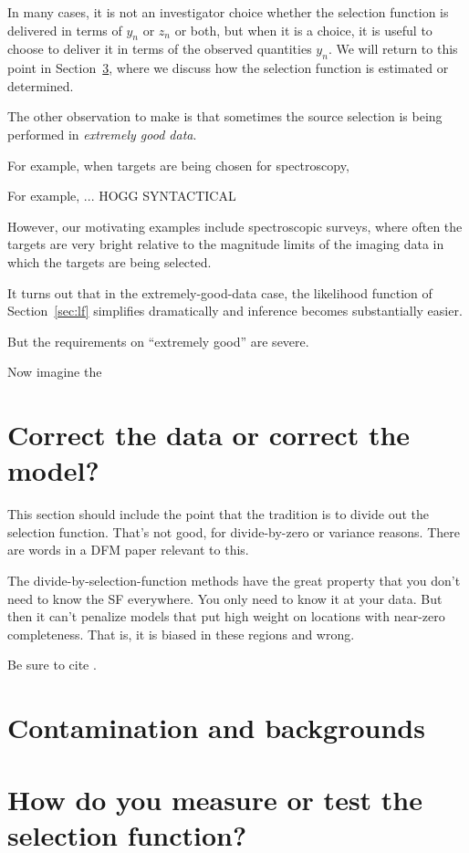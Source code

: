 \documentclass[modern]{aastex62}
\newcommand{\sectionname}{Section}
\begin{document}
In many cases, it is not an investigator choice whether the selection
function is delivered in terms of $y_n$ or $z_n$ or both, but when it
is a choice, it is useful to choose to deliver it in terms of the
observed quantities $y_n$.
We will return to this point in \sectionname~\ref{sec:estimate}, where
we discuss how the selection function is estimated or determined.

The other observation to make is that sometimes the source selection is
being performed in \emph{extremely good data}.

For example, when targets are being chosen for spectroscopy, 

For example, ... HOGG SYNTACTICAL

However, our motivating examples include spectroscopic surveys, where
often the targets are very bright relative to the magnitude limits of
the imaging data in which the targets are being selected.

It turns out that in the extremely-good-data case, the likelihood
function of \sectionname~\ref{sec:lf} simplifies dramatically and
inference becomes substantially easier.

But the requirements on ``extremely good'' are severe.

Now imagine the 

\section{Correct the data or correct the model?}\label{sec:correct}

This section should include the point that the tradition is to divide out
the selection function. That's not good, for divide-by-zero or variance
reasons. There are words in a DFM paper relevant to this.

The divide-by-selection-function methods have the great property that you don't need
to know the SF everywhere. You only need to know it at your data. But then
it can't penalize models that put high weight on locations with near-zero
completeness. That is, it is biased in these regions and wrong.

Be sure to cite \citet{blogpost}.

\section{Contamination and backgrounds}\label{sec:bg}

\section{How do you measure or test the selection function?}\label{sec:estimate}
\end{document}
